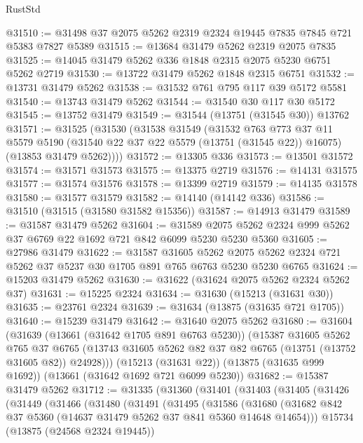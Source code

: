 \begin{lexlean}{RustStd}
\begin{coremodule}
@31510 := @31498 @37 @2075 @5262 @2319 @2324 @19445 @7835 @7845 @721 @5383 @7827 @5389
@31515 := @13684 @31479 @5262 @2319 @2075 @7835
@31525 := @14045 @31479 @5262 @336 @1848 @2315 @2075 @5230 @6751 @5262 @2719
@31530 := @13722 @31479 @5262 @1848 @2315 @6751
@31532 := @13731 @31479 @5262
@31538 := @31532 @761 @795 @117 @39 @5172 @5581
@31540 := @13743 @31479 @5262
@31544 := @31540 @30 @117 @30 @5172
@31545 := @13752 @31479
@31549 := @31544 (@13751 (@31545 @30)) @13762
@31571 := @31525
    (@31530
      (@31538
        @31549
        (@31532
          @763
          @773
          @37
          @11
          @5579
          @5190
          (@31540 @22 @37 @22 @5579 (@13751 (@31545 @22)) @16075)
          (@13853 @31479 @5262))))
@31572 := @13305 @336
@31573 := @13501 @31572
@31574 := @31571 @31573
@31575 := @13375 @2719
@31576 := @14131 @31575
@31577 := @31574 @31576
@31578 := @13399 @2719
@31579 := @14135 @31578
@31580 := @31577 @31579
@31582 := @14140 (@14142 @336)
@31586 := @31510 (@31515 (@31580 @31582 @15356))
@31587 := @14913 @31479
@31589 := @31587 @31479 @5262
@31604 := @31589 @2075 @5262 @2324 @999 @5262 @37 @6769 @22 @1692 @721 @842 @6099 @5230 @5230 @5360
@31605 := @27986 @31479
@31622 := @31587
    @31605
    @5262
    @2075
    @5262
    @2324
    @721
    @5262
    @37
    @5237
    @30
    @1705
    @891
    @765
    @6763
    @5230
    @5230
    @6765
@31624 := @15203 @31479 @5262
@31630 := @31622 (@31624 @2075 @5262 @2324 @5262 @37)
@31631 := @15225 @2324
@31634 := @31630 (@15213 (@31631 @30))
@31635 := @23761 @2324
@31639 := @31634 (@13875 (@31635 @721 @1705))
@31640 := @15239 @31479
@31642 := @31640 @2075 @5262
@31680 := @31604
    (@31639
      (@13661 (@31642 @1705 @891 @6763 @5230))
      (@15387
        @31605
        @5262
        @765
        @37
        @6765
        (@13743 @31605 @5262 @82 @37 @82 @6765 (@13751 (@13752 @31605 @82)) @24928)))
    (@15213 (@31631 @22))
    (@13875 (@31635 @999 @1692))
    (@13661 (@31642 @1692 @721 @6099 @5230))
@31682 := @15387 @31479 @5262
@31712 := @31335
    (@31360
      (@31401
        (@31403
          (@31405
            (@31426
              (@31449
                (@31466
                  (@31480
                    (@31491
                      (@31495
                        (@31586
                          (@31680
                            (@31682
                              @842
                              @37
                              @5360
                              (@14637 @31479 @5262 @37 @841 @5360 @14648 @14654)))
                          @15734
                          (@13875 (@24568 @2324 @19445))

\end{coremodule}
\end{lexlean}
